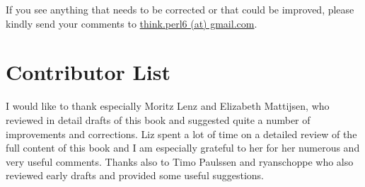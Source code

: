 If you see anything that needs to be corrected or that 
could be improved, please kindly send your comments to 
\url{think.perl6 (at) gmail.com}.


\section*{Contributor List}

I would like to thank especially Moritz Lenz and Elizabeth 
Mattijsen, who reviewed in detail drafts of this book 
and suggested quite a number of improvements and corrections. Liz 
spent a lot of time on a detailed review of the full 
content of this book and I am especially grateful to her for 
her numerous and very useful comments. Thanks also to Timo Paulssen and 
ryanschoppe who also reviewed early drafts and provided some  
useful suggestions.


\clearemptydoublepage

\begin{latexonly}

\tableofcontents

\clearemptydoublepage

\end{latexonly}

